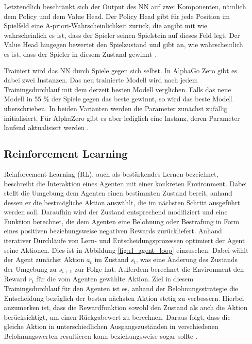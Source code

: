 \documentclass[12pt,a4paper]{article}
\begin{document}
Letztendlich beschränkt sich der Output des NN auf zwei Komponenten, nämlich dem Policy und dem Value Head. Der Policy Head gibt für jede Position im Spielfeld eine A-priori-Wahrscheinlichkeit zurück, die angibt mit wie wahrscheinlich es ist, dass der Spieler seinen Spielstein auf dieses Feld legt. Der Value Head hingegen bewertet den Spielzustand und gibt an, wie wahrscheinlich es ist, dass der Spieler in diesem Zustand gewinnt \cite{Silver2017}.

Trainiert wird das NN durch Spiele gegen sich selbst. In AlphaGo Zero gibt es dabei zwei Instanzen. Das neu trainierte Modell wird nach jedem Trainingsdurchlauf mit dem derzeit besten Modell verglichen. Falls das neue Modell in 55 \% der Spiele gegen das beste gewinnt, so wird das beste Modell überschrieben. In beiden Varianten werden die Parameter zunächst zufällig initialisiert. Für AlphaZero gibt es aber lediglich eine Instanz, deren Parameter laufend aktualisiert werden \cite{SilverHubert2017}. 

\subsection{Reinforcement Learning}
Reinforcement Learning (RL), auch als bestärkendes Lernen bezeichnet, beschreibt die Interaktion eines Agenten mit einer konkreten Environment. Dabei stellt die Umgebung dem Agenten einen bestimmten Zustand bereit, anhand dessen er die bestmögliche Aktion auswählt, die im nächsten Schritt ausgeführt werden soll. Daraufhin wird der Zustand entsprechend modifiziert und eine Funktion berechnet, die dem Agenten eine Belohnung oder Bestrafung in Form eines positiven beziehungsweise negativen Rewards zurückliefert. Anhand iterativer Durchläufe von Lern- und Entscheidungsprozessen optimiert der Agent seine Aktionen. Dies ist in Abbildung \ref{fig:rl_agent_loop} einzusehen. Dabei wählt der Agent zunächst Aktion $a_{t}$ im Zustand $s_{t}$, was eine Änderung des Zustands der Umgebung zu $s_{t+1}$ zur Folge hat. Außerdem berechnet die Environment den Reward $r_{t}$ für die vom Agenten gewählte Aktion. Ziel in diesem Trainingsdurchlauf für den Agenten ist es, anhand der Belohnungsstrategie die Entscheidung bezüglich der besten nächsten Aktion stetig zu verbessern. Hierbei anzumerken ist, dass die Rewardfunktion sowohl den Zustand als auch die Aktion berücksichtigt, um einen Rückgabewert zu berechnen. Daraus folgt, dass die gleiche Aktion in unterschiedlichen Ausgangszuständen in verschiedenen Belohnungswerten resultieren kann beziehungsweise sogar sollte \cite[S. 2]{Sewak2019}.
\end{document}
